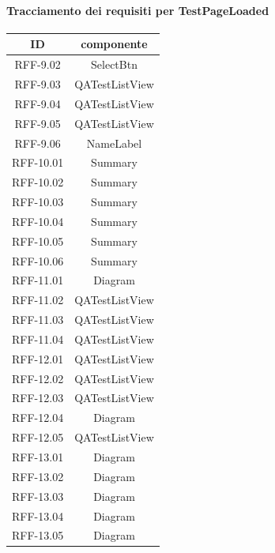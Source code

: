 \paragraph{Tracciamento dei requisiti per TestPageLoaded}
\begin{tabularx}{\textwidth}{|c|c|}
    \hline
    \textbf{ID} & \textbf{componente} \\
    \hline
        RFF-9.02 & SelectBtn \\
    \hline
        RFF-9.03 & QATestListView \\
    \hline
        RFF-9.04 & QATestListView \\
    \hline
        RFF-9.05 & QATestListView \\
    \hline
        RFF-9.06 & NameLabel \\
    \hline
        RFF-10.01 & Summary \\
    \hline
        RFF-10.02 & Summary \\
    \hline
        RFF-10.03 & Summary \\
    \hline
        RFF-10.04 & Summary \\
    \hline
        RFF-10.05 & Summary \\
    \hline
        RFF-10.06 & Summary \\
    \hline
        RFF-11.01 & Diagram \\
    \hline
        RFF-11.02 & QATestListView \\
    \hline
        RFF-11.03 & QATestListView \\
    \hline
        RFF-11.04 & QATestListView \\
    \hline
        RFF-12.01 & QATestListView \\
    \hline
        RFF-12.02 & QATestListView \\
    \hline
        RFF-12.03 & QATestListView \\
    \hline
        RFF-12.04 & Diagram \\
    \hline
        RFF-12.05 & QATestListView \\
    \hline
        RFF-13.01 & Diagram \\
    \hline
        RFF-13.02 & Diagram \\
    \hline
        RFF-13.03 & Diagram \\
    \hline
        RFF-13.04 & Diagram \\
    \hline
        RFF-13.05 & Diagram \\
    \hline
\end{tabularx}